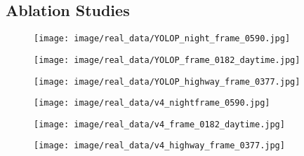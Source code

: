 \documentclass[lettersize,journal]{IEEEtran}
\begin{document}
\subsection{Ablation Studies}
\label{subsec: Ablation Studies}
\begin{figure*}[!h]
    \centering
    
    \begin{subfigure}[b]{0.05\textwidth}
        \centering
        \vspace{0.6cm} 
    \end{subfigure}\begin{subfigure}{0.25\textwidth}
        \centering
        \texttt{[image: image/real\_data/YOLOP\_night\_frame\_0590.jpg]}
    \end{subfigure}\hspace{0.5cm}
    \begin{subfigure}{0.25\textwidth}
        \centering
        \texttt{[image: image/real\_data/YOLOP\_frame\_0182\_daytime.jpg]}
    \end{subfigure}\hspace{0.5cm}
    \begin{subfigure}{0.25\textwidth}
        \centering
        \texttt{[image: image/real\_data/YOLOP\_highway\_frame\_0377.jpg]}
    \end{subfigure}
    
    \medskip
    
    \begin{subfigure}[b]{0.05\textwidth}
        \centering
        \vspace{0.2cm}
    \end{subfigure}\begin{subfigure}{0.25\textwidth}
        \centering
        \texttt{[image: image/real\_data/v4\_nightframe\_0590.jpg]}
    \end{subfigure}\hspace{0.5cm}
    \begin{subfigure}{0.25\textwidth}
        \centering
        \texttt{[image: image/real\_data/v4\_frame\_0182\_daytime.jpg]}
    \end{subfigure}\hspace{0.5cm}
    \begin{subfigure}{0.25\textwidth}
        \centering
        \texttt{[image: image/real\_data/v4\_highway\_frame\_0377.jpg]}
    \end{subfigure}


\end{figure*}
\end{document}
